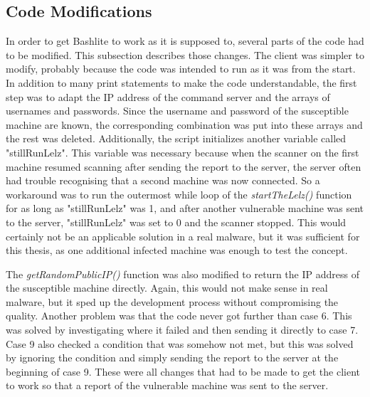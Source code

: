 \subsection{Code Modifications}
In order to get Bashlite to work as it is supposed to, several parts of the code had to be modified. This subsection describes those changes. The client was simpler to modify, probably because the code was intended to run as it was from the start.
In addition to many print statements to make the code understandable, the first step was to adapt the IP address of the command server and the arrays of usernames and passwords. Since the username and password of the susceptible machine are known, the corresponding combination was put into these arrays and the rest was deleted. Additionally, the script initializes another variable called "stillRunLelz". This variable was necessary because when the scanner on the first machine resumed scanning after sending the report to the server, the server often had trouble recognising that a second machine was now connected. So a workaround was to run the outermost while loop of the \textit{startTheLelz()} function for as long as "stillRunLelz" was 1, and after another vulnerable machine was sent to the server, "stillRunLelz" was set to 0 and the scanner stopped. This would certainly not be an applicable solution in a real malware, but it was sufficient for this thesis, as one additional infected machine was enough to test the concept.

The \textit{getRandomPublicIP()} function was also modified to return the IP address of the susceptible machine directly. Again, this would not make sense in real malware, but it sped up the development process without compromising the quality. Another problem was that the code never got further than case 6. This was solved by investigating where it failed and then sending it directly to case 7. Case 9 also checked a condition that was somehow not met, but this was solved by ignoring the condition and simply sending the report to the server at the beginning of case 9. These were all changes that had to be made to get the client to work so that a report of the vulnerable machine was sent to the server.



